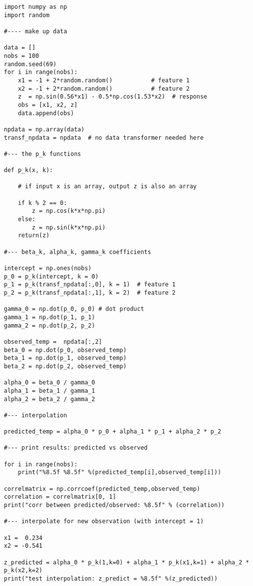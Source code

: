 \documentclass[oneside,10pt]{book}
\begin{document}
\begin{lstlisting}
import numpy as np
import random

#---- make up data

data = []
nobs = 100
random.seed(69)
for i in range(nobs):
    x1 = -1 + 2*random.random()           # feature 1
    x2 = -1 + 2*random.random()           # feature 2
    z  = np.sin(0.56*x1) - 0.5*np.cos(1.53*x2)  # response
    obs = [x1, x2, z]
    data.append(obs)

npdata = np.array(data)
transf_npdata = npdata  # no data transformer needed here

#--- the p_k functions

def p_k(x, k):

    # if input x is an array, output z is also an array

    if k % 2 == 0:
        z = np.cos(k*x*np.pi)
    else:
        z = np.sin(k*x*np.pi)
    return(z)

#--- beta_k, alpha_k, gamma_k coefficients

intercept = np.ones(nobs)
p_0 = p_k(intercept, k = 0)
p_1 = p_k(transf_npdata[:,0], k = 1)  # feature 1
p_2 = p_k(transf_npdata[:,1], k = 2)  # feature 2

gamma_0 = np.dot(p_0, p_0) # dot product
gamma_1 = np.dot(p_1, p_1)
gamma_2 = np.dot(p_2, p_2)

observed_temp =  npdata[:,2]
beta_0 = np.dot(p_0, observed_temp)
beta_1 = np.dot(p_1, observed_temp)
beta_2 = np.dot(p_2, observed_temp)

alpha_0 = beta_0 / gamma_0
alpha_1 = beta_1 / gamma_1
alpha_2 = beta_2 / gamma_2

#--- interpolation

predicted_temp = alpha_0 * p_0 + alpha_1 * p_1 + alpha_2 * p_2

#--- print results: predicted vs observed

for i in range(nobs):
    print("%8.5f %8.5f" %(predicted_temp[i],observed_temp[i]))

correlmatrix = np.corrcoef(predicted_temp,observed_temp)
correlation = correlmatrix[0, 1]
print("corr between predicted/observed: %8.5f" % (correlation))

#--- interpolate for new observation (with intercept = 1)

x1 =  0.234
x2 = -0.541

z_predicted = alpha_0 * p_k(1,k=0) + alpha_1 * p_k(x1,k=1) + alpha_2 * p_k(x2,k=2)
print("test interpolation: z_predict = %8.5f" %(z_predicted))
\end{lstlisting}
\end{document}
